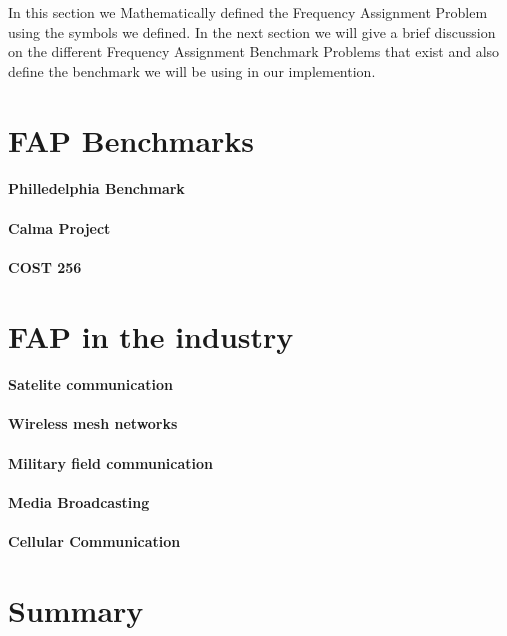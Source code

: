 In this section we Mathematically defined the Frequency Assignment Problem using the symbols we defined. In the next section we will give a brief discussion on the different Frequency Assignment Benchmark Problems that exist and also define the benchmark we will be using in our implemention.
\section{FAP Benchmarks}
\paragraph{Philledelphia Benchmark}
\paragraph{Calma Project}
\paragraph{COST 256}
\section{FAP in the industry}
\paragraph{Satelite communication}
\paragraph{Wireless mesh networks}
\paragraph{Military field communication}
\paragraph{Media Broadcasting}
\paragraph{Cellular Communication}
\section{Summary}
